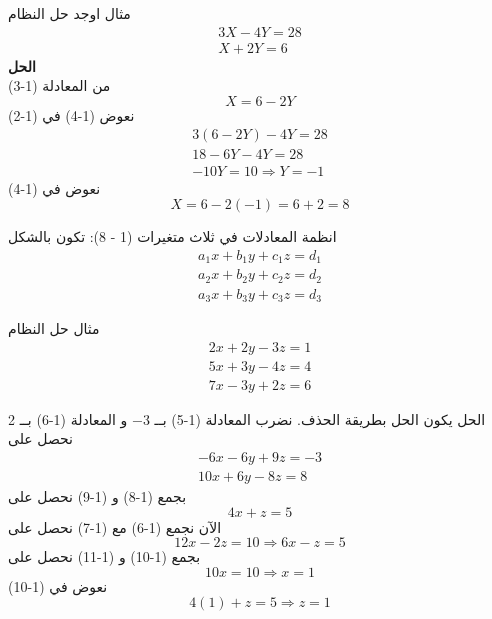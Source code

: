 	\begin{frame}
		\begin{exampleblock}{مثال}
				اوجد حل النظام
			\begin{gather}
				3X - 4Y = 28\\
				X+2Y = 6
			\end{gather}
			\noindent
			\textbf{الحل}\\
			\noindent
			من المعادلة (1-3)
			\begin{equation}
				X = 6 -2Y
			\end{equation}
			نعوض (1-4) في (1-2)
			\begin{gather*}
				3(6-2Y) - 4Y = 28\\
				18 - 6Y - 4Y = 28\\
				-10 Y = 10
				\Rightarrow Y = -1
			\end{gather*}
			نعوض في (1-4)
			\[
			X = 6-2(-1) = 6+2 = 8
			\] 
		\end{exampleblock}
	\end{frame}
	
	\begin{frame}
		\begin{exampleblock}{انظمة المعادلات في ثلاث متغيرات (1 - 8)\sen{\cite{odesolapp}}:}
			تكون بالشكل
			\begin{gather*}
				a_1 x + b_1 y + c_1 z = d_1\\
				a_2 x + b_2 y + c_2 z = d_2\\
				a_3 x + b_3 y + c_3 z = d_3
			\end{gather*}
		\end{exampleblock}
		
		\begin{exampleblock}{مثال}
			حل النظام
			\begin{gather}
				2x + 2y - 3z = 1\\
				5x + 3y - 4z = 4 \\
				7x - 3y + 2z =6
			\end{gather}
		\end{exampleblock}
	\end{frame}
	
	\begin{frame}
		\begin{exampleblock}{الحل}
				يكون الحل بطريقة الحذف. نضرب المعادلة (1-5) بــ $-3$ و المعادلة (1-6) بــ 2
			نحصل على 
			\begin{gather}
				-6x -6y +9z =-3\\
				10x + 6y -8z =8
			\end{gather}
			بجمع (1-8) و (1-9) نحصل على 
			\begin{equation}
				4x + z =5
			\end{equation}
			الآن نجمع (1-6) مع (1-7) نحصل على
			\begin{equation}
				12x -2z = 10 \Rightarrow 6x - z = 5  
			\end{equation}
			بجمع (1-10) و (1-11) نحصل على
			\[
			10x = 10 \Rightarrow x=1
			\]
			نعوض في (1-10)
			\[
			4(1) + z = 5 \Rightarrow z=1
			\]
			\end{exampleblock}
	     	\end{frame}
	     	
